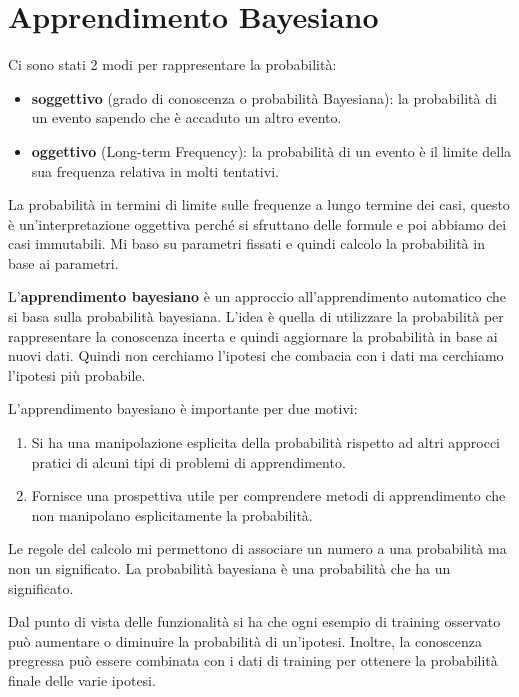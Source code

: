 \chapter{Apprendimento Bayesiano}
Ci sono stati 2 modi per rappresentare la probabilità:
\begin{itemize}
    \item \textbf{soggettivo} (grado di conoscenza o probabilità Bayesiana): la probabilità
          di un evento sapendo che è accaduto un altro evento.
    \item \textbf{oggettivo} (Long-term Frequency): la probabilità di un evento
          è il limite della sua frequenza relativa in molti tentativi.
\end{itemize}
La probabilità in termini di limite sulle frequenze a lungo termine dei casi,
questo è un'interpretazione oggettiva perché si sfruttano delle formule e poi
abbiamo dei casi immutabili. Mi baso su parametri fissati e quindi calcolo la
probabilità in base ai parametri.

L'\textbf{apprendimento bayesiano} è un approccio all'apprendimento automatico che si basa
sulla probabilità bayesiana. L'idea è quella di utilizzare la probabilità per
rappresentare la conoscenza incerta e quindi aggiornare la probabilità in base
ai nuovi dati. Quindi non cerchiamo l'ipotesi che combacia con i dati ma cerchiamo
l'ipotesi più probabile.

L'apprendimento bayesiano è importante per due motivi:
\begin{enumerate}
    \item Si ha una manipolazione esplicita della probabilità rispetto ad altri
          approcci pratici di alcuni tipi di problemi di apprendimento.
    \item Fornisce una prospettiva utile per comprendere metodi di apprendimento
          che non manipolano esplicitamente la probabilità.
\end{enumerate}
Le regole del calcolo mi permettono di associare un numero a una probabilità ma
non un significato. La probabilità bayesiana è una probabilità che ha un significato.

Dal punto di vista delle funzionalità si ha che ogni esempio di training osservato
può aumentare o diminuire la probabilità di un'ipotesi. Inoltre, la conoscenza
pregressa può essere combinata con i dati di training per ottenere la probabilità
finale delle varie ipotesi.

